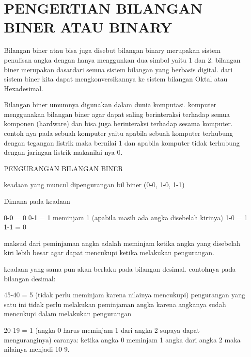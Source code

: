 \section{PENGERTIAN BILANGAN BINER ATAU BINARY}

Bilangan biner atau bisa juga disebut bilangan binary merupakan sistem penulisan angka dengan hanya menggunkan dua simbol yaitu 1 dan 2. bilangan biner merupakan dasardari semua sistem bilangan yang berbasis digital. dari sistem biner kita dapat mengkonversikannya ke sistem bilangan Oktal atau Hexadesimal.

Bilangan biner umumnya digunakan dalam dunia komputasi. komputer menggunakan bilangan biner agar dapat saling berinteraksi terhadap semua komponen (hardware) dan bisa juga berinteraksi terhadap sesama komputer. contoh nya pada sebuah komputer yaitu apabila sebuah komputer terhubung dengan tegangan listrik maka bernilai 1 dan apabila komputer tidak terhubung dengan jaringan listrik makanilai nya 0.

PENGURANGAN BILANGAN BINER

keadaan yang muncul dipengurangan bil biner
(0-0, 1-0, 1-1)

Dimana pada keadaan

	0-0 = 0
	0-1 = 1 meminjam 1 (apabila masih ada angka disebelah kirinya)
	1-0 = 1
	1-1 = 0
	
maksud dari peminjaman angka adalah meminjam ketika angka yang disebelah kiri lebih besar agar dapat mencukupi ketika melakukan pengurangan.

keadaan yang sama pun akan berlaku pada bilangan desimal.
contohnya pada bilangan desimal:

	45-40 = 5 (tidak perlu meminjam karena nilainya mencukupi)
pengurangan yang satu ini tidak perlu melakukan peminjaman angka karena angkanya sudah mencukupi dalam melakukan pengurangan
				
	20-19 = 1 (angka 0 harus meminjam 1 dari angka 2 supaya dapat menguranginya)
		caranya: ketika angka 0 meminjam 1 angka dari angka 2 maka nilainya menjadi 10-9.
